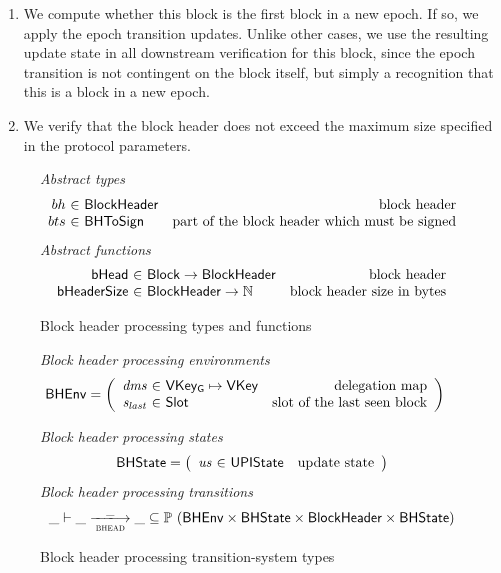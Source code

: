 \documentclass[11pt,a4paper]{article}
\newcommand{\powerset}[1]{\mathbb{P}~#1}
\newcommand{\var}[1]{\mathit{#1}}
\newcommand{\fun}[1]{\mathsf{#1}}
\newcommand{\type}[1]{\mathsf{#1}}
\newcommand{\trans}[2]{\xlongrightarrow[\textsc{#1}]{#2}}
\newcommand{\totalf}{\to}
\newcommand{\Slot}{\type{Slot}}
\newcommand{\Block}{\type{Block}}
\newcommand{\VKey}{\type{VKey}}
\newcommand{\VKeyGen}{\type{VKey_G}}
\newcommand{\bhdrsizename}{bHeaderSize}
\begin{document}
\begin{enumerate}
  \item We compute whether this block is the first block in a new epoch.
    If so, we apply the epoch transition updates. Unlike other cases, we use the
    resulting update state in all downstream verification for this block, since
    the epoch transition is not contingent on the block itself, but simply a
    recognition that this is a block in a new epoch.
  \item We verify that the block header does not exceed the maximum size
    specified in the protocol parameters.
\end{enumerate}

\begin{figure}[ht]
  \emph{Abstract types}
  \begin{equation*}
    \begin{array}{r@{~\in~}lr}
      bh & \Bhead & \text{block header} \\
      bts & \Bhtosign & \text{part of the block header which must be signed}
    \end{array}
  \end{equation*}
  \emph{Abstract functions}
  \begin{equation*}
    \begin{array}{r@{~\in~}lr}
      \fun{\bheadname} & \Block \totalf \Bhead & \text{block header} \\
      \fun{\bhdrsizename} & \Bhead \totalf \mathbb{N} & \text{block header size in bytes}
    \end{array}
  \end{equation*}
  \caption{Block header processing types and functions}
  \label{fig:defs:bhead}
\end{figure}

\begin{figure}[ht]
  \emph{Block header processing environments}
  \begin{align*}
    & \BHEnv
      = \left(
      \begin{array}{r@{~\in~}lr}
        \var{dms} & \VKeyGen \mapsto \VKey & \text{delegation map}\\
        \var{s_{last}} & \Slot & \text{slot of the last seen block}
      \end{array}\right)
  \end{align*}

  \emph{Block header processing states}
  \begin{equation*}
    \BHState =
    \left(
      \begin{array}{r@{~\in~}lr}
        \var{us} & \UPIState & \text{update state}
      \end{array}
    \right)
  \end{equation*}
  \emph{Block header processing transitions}
  \begin{equation*}
    \var{\_} \vdash \var{\_} \trans{bhead}{\_} \var{\_} \subseteq
    \powerset (\BHEnv \times \BHState \times \Bhead \times \BHState)
  \end{equation*}
  \caption{Block header processing transition-system types}
  \label{fig:ts-types:bhead}
\end{figure}
\end{document}
